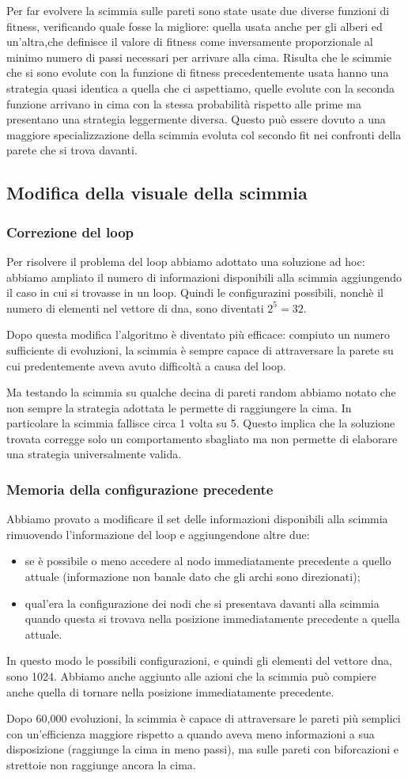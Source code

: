 \documentclass{article}
\begin{document}
Per far evolvere la scimmia sulle pareti sono state usate due diverse funzioni di fitness, verificando quale fosse la migliore: quella usata anche per gli alberi ed un'altra,che definisce il valore di fitness come inversamente proporzionale al minimo numero di passi necessari per arrivare alla cima. Risulta che le scimmie che si sono evolute con la funzione di fitness precedentemente usata hanno una strategia quasi identica a quella che ci aspettiamo, quelle evolute con la seconda funzione arrivano in cima con la stessa probabilit\`{a} rispetto alle prime ma presentano una strategia leggermente diversa. Questo pu\`{o} essere dovuto a una maggiore specializzazione della scimmia evoluta col secondo fit nei confronti della parete che si trova davanti.

\subsection{Modifica della visuale della scimmia}
\subsubsection{Correzione del loop}
Per risolvere il problema del loop abbiamo adottato una soluzione ad hoc: abbiamo ampliato il numero di informazioni disponibili alla scimmia aggiungendo il caso in cui si trovasse in un loop.
Quindi le configurazini possibili, nonch\`{e} il numero di elementi nel vettore di dna, sono diventati $2^5=32$. 

Dopo questa modifica l'algoritmo \`{e} diventato pi\`{u} efficace: compiuto un numero sufficiente di evoluzioni, la scimmia \`{e} sempre capace di attraversare la parete su cui predentemente aveva avuto difficolt\`{a} a causa del loop.

Ma testando la scimmia su qualche decina di pareti random  abbiamo notato che non sempre la strategia adottata le permette di raggiungere la cima. In particolare la scimmia fallisce circa 1 volta su 5. Questo implica che la soluzione trovata corregge solo un comportamento sbagliato ma non permette di elaborare una strategia universalmente valida.


\subsubsection{Memoria della configurazione precedente}
Abbiamo provato a modificare il set delle informazioni disponibili alla scimmia rimuovendo l'informazione del loop e aggiungendone altre due:
\begin{itemize}
		\item se \`{e} possibile o meno accedere al nodo immediatamente precedente a quello attuale (informazione non banale dato che gli archi sono direzionati);
		\item qual'era la configurazione dei nodi che si presentava davanti alla scimmia quando questa si trovava nella posizione immediatamente precedente a quella attuale. 
	\end{itemize}
 In questo modo le possibili configurazioni, e quindi gli elementi del vettore dna, sono 1024.
 Abbiamo anche aggiunto alle azioni che la scimmia pu\`{o} compiere anche quella di tornare nella posizione immediatamente precedente.
 
 Dopo 60,000 evoluzioni, la scimmia \`{e} capace di attraversare le pareti pi\`{u} semplici con un'efficienza maggiore rispetto a quando aveva meno informazioni a sua disposizione (raggiunge la cima in meno passi), ma sulle pareti con biforcazioni e strettoie non raggiunge ancora la cima.
 
\end{document}

